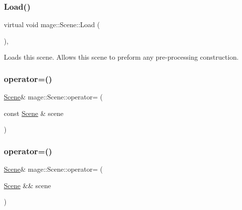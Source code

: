 \subsubsection{\texorpdfstring{Load()}{Load()}}
{\footnotesize\ttfamily virtual void mage\+::\+Scene\+::\+Load (\begin{DoxyParamCaption}{ }\end{DoxyParamCaption})\hspace{0.3cm}{\ttfamily [private]}, {\ttfamily [virtual]}}

Loads this scene. Allows this scene to preform any pre-\/processing construction. \hypertarget{classmage_1_1_scene_a2c25c0fedc0230771d8c00a8288a69ce}{}\label{classmage_1_1_scene_a2c25c0fedc0230771d8c00a8288a69ce} 
\subsubsection{\texorpdfstring{operator=()}{operator=()}\hspace{0.1cm}{\footnotesize\ttfamily [1/2]}}
{\footnotesize\ttfamily \hyperlink{classmage_1_1_scene}{Scene}\& mage\+::\+Scene\+::operator= (\begin{DoxyParamCaption}\item[{const \hyperlink{classmage_1_1_scene}{Scene} \&}]{scene }\end{DoxyParamCaption})\hspace{0.3cm}{\ttfamily [delete]}}

\hypertarget{classmage_1_1_scene_a400926762670c9cd9b6d456291600f53}{}\label{classmage_1_1_scene_a400926762670c9cd9b6d456291600f53} 
\subsubsection{\texorpdfstring{operator=()}{operator=()}\hspace{0.1cm}{\footnotesize\ttfamily [2/2]}}
{\footnotesize\ttfamily \hyperlink{classmage_1_1_scene}{Scene}\& mage\+::\+Scene\+::operator= (\begin{DoxyParamCaption}\item[{\hyperlink{classmage_1_1_scene}{Scene} \&\&}]{scene }\end{DoxyParamCaption})\hspace{0.3cm}{\ttfamily [delete]}}

